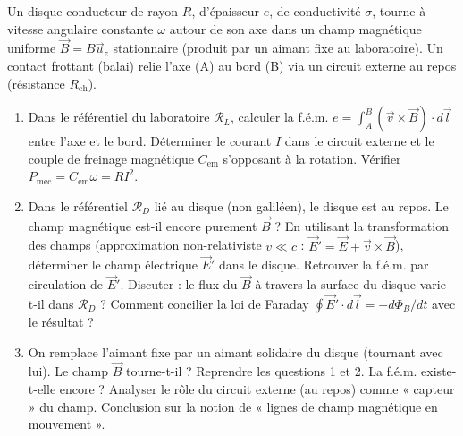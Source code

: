\documentclass[11pt]{article}
\begin{document}
\begin{exercice}
Un disque conducteur de rayon $R$, d'épaisseur $e$, de conductivité $\sigma$, tourne à vitesse angulaire constante $\omega$ autour de son axe dans un champ magnétique uniforme $\vec{B} = B\vec{u}_z$ stationnaire (produit par un aimant fixe au laboratoire). Un contact frottant (balai) relie l'axe (A) au bord (B) via un circuit externe au repos (résistance $R_{\text{ch}}$).
\begin{enumerate}
    \item Dans le référentiel du laboratoire $\mathcal{R}_L$, calculer la f.é.m. $e = \int_A^B (\vec{v} \times \vec{B}) \cdot d\vec{l}$ entre l'axe et le bord. Déterminer le courant $I$ dans le circuit externe et le couple de freinage magnétique $C_{\text{em}}$ s'opposant à la rotation. Vérifier $P_{\text{mec}} = C_{\text{em}}\omega = RI^2$.
    \item Dans le référentiel $\mathcal{R}_D$ lié au disque (non galiléen), le disque est au repos. Le champ magnétique est-il encore purement $\vec{B}$ ? En utilisant la transformation des champs (approximation non-relativiste $v \ll c$ : $\vec{E}' = \vec{E} + \vec{v} \times \vec{B}$), déterminer le champ électrique $\vec{E}'$ dans le disque. Retrouver la f.é.m. par circulation de $\vec{E}'$. Discuter : le flux du $\vec{B}$ à travers la surface du disque varie-t-il dans $\mathcal{R}_D$ ? Comment concilier la loi de Faraday $\oint \vec{E}' \cdot d\vec{l} = -d\Phi_B/dt$ avec le résultat ?
    \item On remplace l'aimant fixe par un aimant solidaire du disque (tournant avec lui). Le champ $\vec{B}$ tourne-t-il ? Reprendre les questions 1 et 2. La f.é.m. existe-t-elle encore ? Analyser le rôle du circuit externe (au repos) comme « capteur » du champ. Conclusion sur la notion de « lignes de champ magnétique en mouvement ».
\end{enumerate}
\end{exercice}
\end{document}
